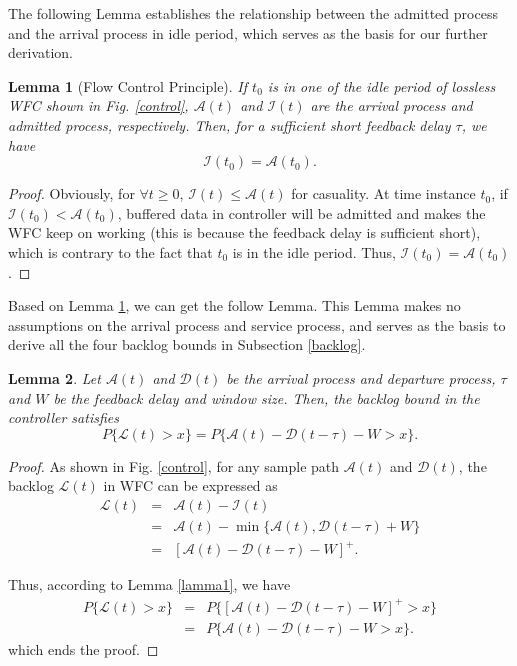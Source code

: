 \documentclass[paper]{ieice}
\newtheorem{lemma}{Lemma}
\newtheorem{proof}{Proof}
\begin{document}
The following Lemma establishes the relationship between the admitted process and the arrival process in idle period, which serves as the basis for our further derivation.
\begin{lemma}[Flow Control Principle]\label{lama1}
If $t_0$ is in one of the idle period of lossless WFC shown in Fig. \ref{control}, $\mathcal{A}(t)$ and $\mathcal{I}(t)$ are the arrival process and admitted process, respectively. Then, for a sufficient short feedback delay $\tau$, we have
\begin{equation}
\mathcal{I}(t_0)=\mathcal{A}(t_0).
\end{equation}
\end{lemma}
\begin{proof}
Obviously, for $\forall t\geq 0$, $\mathcal{I}(t)\leq \mathcal{A}(t)$ for casuality. At time instance $t_0$, if $\mathcal{I}(t_0)<\mathcal{A}(t_0)$, buffered data in controller will be admitted and makes the WFC keep on working (this is because the feedback delay is sufficient short), which is contrary to the fact that $t_0$ is in the idle period. Thus, $\mathcal{I}(t_0)=\mathcal{A}(t_0)$.\QED
\end{proof}

Based on Lemma \ref{lama1}, we can get the follow Lemma. This Lemma makes no assumptions on the arrival process and service process, and serves as the basis to derive all the four backlog bounds in Subsection \ref{backlog}.
\begin{lemma}\label{lama2}
Let $\mathcal{A}(t)$ and $\mathcal{D}(t)$ be the arrival process and departure process, $\tau$ and $W$ be the feedback delay and window size. Then, the backlog bound in the controller satisfies
$$P\{\mathcal{L}(t)>x\}=P\{\mathcal{A}(t)-\mathcal{D}(t-\tau)-W>x\}.$$
\end{lemma}
\begin{proof}
As shown in Fig. \ref{control}, for any sample path $\mathcal{A}(t)$ and $\mathcal{D}(t)$, the backlog $\mathcal{L}(t)$ in WFC can be expressed as
\begin{eqnarray}
  \mathcal{L}(t)&=&\mathcal{A}(t)-\mathcal{I}(t)\nonumber\\
      &=&\mathcal{A}(t)-\min\{\mathcal{A}(t),\mathcal{D}(t-\tau)+W\}\nonumber\\
      &=&[\mathcal{A}(t)-\mathcal{D}(t-\tau)-W]^+.\nonumber
\end{eqnarray}

Thus, according to Lemma \ref{lamma1}, we have
\begin{eqnarray*}
  P\{\mathcal{L}(t)>x\}&=&P\{[\mathcal{A}(t)-\mathcal{D}(t-\tau)-W]^+>x\}\\
  &=&P\{\mathcal{A}(t)-\mathcal{D}(t-\tau)-W>x\}.
\end{eqnarray*}
which ends the proof.\QED
\end{proof}
\end{document}
